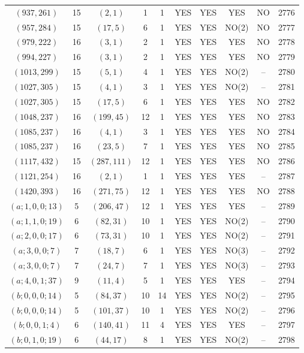 \begin{longtable}{|c|c|c|c|c|c|c|c|c|c|}
$(937, 261)$ & 15 & $(2, 1)$ & 1 & 1 & YES & YES & YES & NO & 2776\\
$(957, 284)$ & 15 & $(17, 5)$ & 6 & 1 & YES & YES & NO(2) & NO & 2777\\
$(979, 222)$ & 16 & $(3, 1)$ & 2 & 1 & YES & YES & YES & NO & 2778\\
$(994, 227)$ & 16 & $(3, 1)$ & 2 & 1 & YES & YES & YES & NO & 2779\\
$(1013, 299)$ & 15 & $(5, 1)$ & 4 & 1 & YES & YES & NO(2) & -- & 2780\\
$(1027, 305)$ & 15 & $(4, 1)$ & 3 & 1 & YES & YES & NO(2) & -- & 2781\\
$(1027, 305)$ & 15 & $(17, 5)$ & 6 & 1 & YES & YES & YES & NO & 2782\\
$(1048, 237)$ & 16 & $(199, 45)$ & 12 & 1 & YES & YES & YES & NO & 2783\\
$(1085, 237)$ & 16 & $(4, 1)$ & 3 & 1 & YES & YES & YES & NO & 2784\\
$(1085, 237)$ & 16 & $(23, 5)$ & 7 & 1 & YES & YES & YES & NO & 2785\\
$(1117, 432)$ & 15 & $(287, 111)$ & 12 & 1 & YES & YES & YES & NO & 2786\\
$(1121, 254)$ & 16 & $(2, 1)$ & 1 & 1 & YES & YES & YES & -- & 2787\\
$(1420, 393)$ & 16 & $(271, 75)$ & 12 & 1 & YES & YES & YES & NO & 2788\\
$(a; 1, 0, 0; 13)$ & 5 & $(206, 47)$ & 12 & 1 & YES & YES & YES & -- & 2789\\
$(a; 1, 1, 0; 19)$ & 6 & $(82, 31)$ & 10 & 1 & YES & YES & NO(2) & -- & 2790\\
$(a; 2, 0, 0; 17)$ & 6 & $(73, 31)$ & 10 & 1 & YES & YES & NO(2) & -- & 2791\\
$(a; 3, 0, 0; 7)$ & 7 & $(18, 7)$ & 6 & 1 & YES & YES & NO(3) & -- & 2792\\
$(a; 3, 0, 0; 7)$ & 7 & $(24, 7)$ & 7 & 1 & YES & YES & NO(3) & -- & 2793\\
$(a; 4, 0, 1; 37)$ & 9 & $(11, 4)$ & 5 & 1 & YES & YES & YES & -- & 2794\\
$(b; 0, 0, 0; 14)$ & 5 & $(84, 37)$ & 10 & 14 & YES & YES & NO(2) & -- & 2795\\
$(b; 0, 0, 0; 14)$ & 5 & $(101, 37)$ & 10 & 1 & YES & YES & NO(2) & -- & 2796\\
$(b; 0, 0, 1; 4)$ & 6 & $(140, 41)$ & 11 & 4 & YES & YES & YES & -- & 2797\\
$(b; 0, 1, 0; 19)$ & 6 & $(44, 17)$ & 8 & 1 & YES & YES & NO(2) & -- & 2798\\

\end{longtable}
